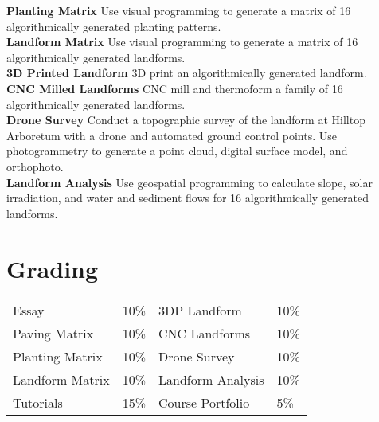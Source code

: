 \documentclass[11pt,article,oneside]{memoir}
\begin{document}
\noindent \textbf{Planting Matrix}
Use visual programming to generate
a matrix of 16 algorithmically generated planting patterns.
\\

\noindent \textbf{Landform Matrix}
Use visual programming to generate
a matrix of 16 algorithmically generated landforms.
\\

\noindent \textbf{3D Printed Landform}
3D print an algorithmically generated landform.
\\

\noindent \textbf{CNC Milled Landforms}
CNC mill and thermoform a family of  16 algorithmically generated landforms.
\\

\noindent \textbf{Drone Survey}
Conduct a topographic survey 
of the landform at Hilltop Arboretum
with a drone and automated ground control points. 
Use photogrammetry to generate a point cloud, 
digital surface model, and orthophoto.
\\

\noindent \textbf{Landform Analysis}
Use geospatial programming to 
calculate slope, solar irradiation,
and water and sediment flows
for 16 algorithmically generated landforms.
\\




\section{Grading}
%
\begin{table}[H]
\begin{tabular}{l r @{\hskip 2cm} l @{\hskip 0.5cm} l}
%
Essay & 10\% & 3DP Landform & 10\% \\
Paving Matrix & 10\% & CNC Landforms & 10\% \\
Planting Matrix & 10\% & Drone Survey & 10\% \\
Landform Matrix & 10\% & Landform Analysis & 10\% \\
Tutorials & 15\% & Course Portfolio & 5\%\\
%
\end{tabular}
\end{table}
\end{document}

